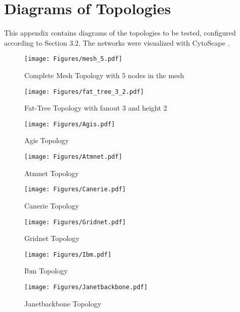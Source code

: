 \chapter{Diagrams of Topologies}
This appendix contains diagrams of the topologies to be tested, configured according to Section 3.2. The networks were visualized with CytoScape \cite{shannon_cytoscape_2003}.

\begin{figure}
    \centering
    \texttt{[image: Figures/mesh\_5.pdf]}
    \caption{Complete Mesh Topology with 5 nodes in the mesh}
    \label{fig:CompleteMesh}
\end{figure}

\begin{figure}
    \centering
    \texttt{[image: Figures/fat\_tree\_3\_2.pdf]}
    \caption{Fat-Tree Topology with fanout 3 and height 2}
    \label{fig:BalancedTree}
\end{figure}


\begin{figure}[htbp]
    \centering
    \texttt{[image: Figures/Agis.pdf]}
    \caption{Agis Topology}
    \label{fig:Agis}
\end{figure}

\begin{figure}[htbp]
    \centering
    \texttt{[image: Figures/Atmnet.pdf]}
    \caption{Atmnet Topology}
    \label{fig:Atmnet}
\end{figure}

\begin{figure}[htbp]
    \centering
    \texttt{[image: Figures/Canerie.pdf]}
    \caption{Canerie Topology}
    \label{fig:Canerie}
\end{figure}

\begin{figure}[htbp]
    \centering
    \texttt{[image: Figures/Gridnet.pdf]}
    \caption{Gridnet Topology}
    \label{fig:Gridnet}
\end{figure}

\begin{figure}[htbp]
    \centering
    \texttt{[image: Figures/Ibm.pdf]}
    \caption{Ibm Topology}
    \label{fig:Ibm}
\end{figure}

\begin{figure}[htbp]
    \centering
    \texttt{[image: Figures/Janetbackbone.pdf]}
    \caption{Janetbackbone Topology}
    \label{fig:Janetbackbone}
\end{figure}


